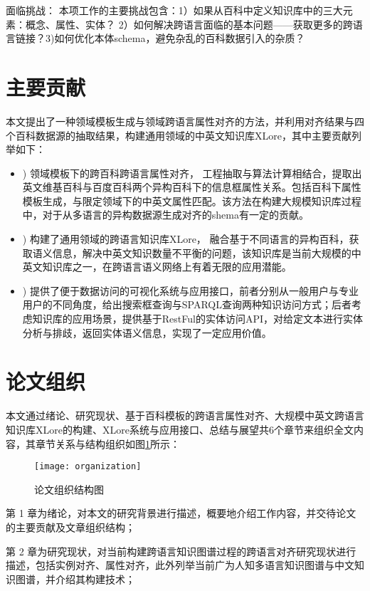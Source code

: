 {\heiti 面临挑战：} 本项工作的主要挑战包含：1）如果从百科中定义知识库中的三大元素：概念、属性、实体？ 2）如何解决跨语言面临的基本问题——获取更多的跨语言链接？3)如何优化本体schema，避免杂乱的百科数据引入的杂质？


\section{主要贡献}
本文提出了一种领域模板生成与领域跨语言属性对齐的方法，并利用对齐结果与四个百科数据源的抽取结果，构建通用领域的中英文知识库XLore，其中主要贡献列举如下：
\begin{itemize}
\item {) 领域模板下的跨百科跨语言属性对齐，} 工程抽取与算法计算相结合，提取出英文维基百科与百度百科两个异构百科下的信息框属性关系。包括百科下属性模板生成，与限定领域下的中英文属性匹配。该方法在构建大规模知识库过程中，对于从多语言的异构数据源生成对齐的shema有一定的贡献。
\item {) 构建了通用领域的跨语言知识库XLore，} 融合基于不同语言的异构百科，获取语义信息，解决中英文知识数量不平衡的问题，该知识库是当前大规模的中英文知识库之一，在跨语言语义网络上有着无限的应用潜能。
\item {) 提供了便于数据访问的可视化系统与应用接口，}前者分别从一般用户与专业用户的不同角度，给出搜索框查询与SPARQL查询两种知识访问方式；后者考虑知识库的应用场景，提供基于RestFul的实体访问API，对给定文本进行实体分析与排歧，返回实体语义信息，实现了一定应用价值。
\end{itemize}

\section{论文组织}

本文通过绪论、研究现状、基于百科模板的跨语言属性对齐、大规模中英文跨语言知识库XLore的构建、XLore系统与应用接口、总结与展望共6个章节来组织全文内容，其章节关系与结构组织如图\ref{fig:organization}所示：

\begin{figure}[H] %
  \centering
  \texttt{[image: organization]}
  \caption{论文组织结构图}
  \label{fig:organization}
\end{figure}

第 1 章为绪论，对本文的研究背景进行描述，概要地介绍工作内容，并交待论文的主要贡献及文章组织结构；

第 2 章为研究现状，对当前构建跨语言知识图谱过程的跨语言对齐研究现状进行描述，包括实例对齐、属性对齐，此外列举当前广为人知多语言知识图谱与中文知识图谱，并介绍其构建技术；

